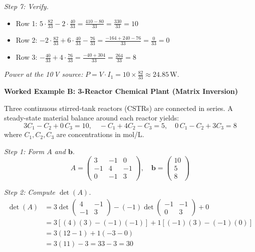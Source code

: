 \documentclass[12pt,a4paper]{article}
\begin{document}
\textit{Step 7: Verify.}
\begin{itemize}[noitemsep]
  \item Row 1: \(5\!\cdot\!\tfrac{82}{33} - 2\!\cdot\!\tfrac{40}{33} = \tfrac{410-80}{33} = \tfrac{330}{33} = 10\) \checkmark
  \item Row 2: \(-2\!\cdot\!\tfrac{82}{33} + 6\!\cdot\!\tfrac{40}{33} - \tfrac{76}{33} = \tfrac{-164+240-76}{33} = \tfrac{0}{33} = 0\) \checkmark
  \item Row 3: \(-\tfrac{40}{33} + 4\!\cdot\!\tfrac{76}{33} = \tfrac{-40+304}{33} = \tfrac{264}{33} = 8\) \checkmark
\end{itemize}

\textit{Power at the 10\,V source:} \(P = V \cdot I_1 = 10 \times \tfrac{82}{33} \approx 24.85\,\text{W}\).

\medskip
\textbf{Worked Example B: 3-Reactor Chemical Plant (Matrix Inversion)}

Three continuous stirred-tank reactors (CSTRs) are connected in series. A steady-state material balance around each reactor yields:
\[
3C_1 - C_2 + 0\,C_3 = 10, \quad -C_1 + 4C_2 - C_3 = 5, \quad 0\,C_1 - C_2 + 3C_3 = 8
\]
where \(C_1, C_2, C_3\) are concentrations in mol/L.

\textit{Step 1: Form \(A\) and \(\mathbf{b}\).}
\[
A = \begin{pmatrix} 3 & -1 & 0 \\ -1 & 4 & -1 \\ 0 & -1 & 3 \end{pmatrix}, \quad \mathbf{b} = \begin{pmatrix} 10 \\ 5 \\ 8 \end{pmatrix}
\]

\textit{Step 2: Compute \(\det(A)\).}
\begin{align*}
\det(A) &= 3\det\begin{pmatrix}4&-1\\-1&3\end{pmatrix}
          - (-1)\det\begin{pmatrix}-1&-1\\0&3\end{pmatrix}
          + 0 \\
&= 3[(4)(3)-(-1)(-1)] + 1[(-1)(3)-(-1)(0)] \\
&= 3(12-1) + 1(-3-0) \\
&= 3(11) - 3 = 33 - 3 = 30
\end{align*}
\end{document}
